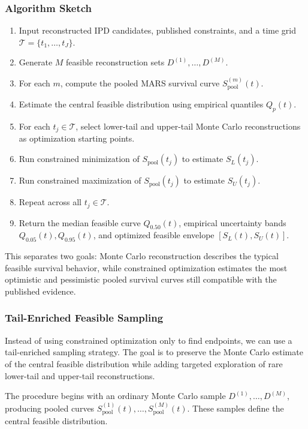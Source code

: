 \documentclass[11pt]{article}
\begin{document}
\subsubsection*{Algorithm Sketch}

\begin{enumerate}
\item Input reconstructed IPD candidates, published constraints, and a time grid \(\mathcal T=\{t_1,\ldots,t_J\}\).
\item Generate \(M\) feasible reconstruction sets \(D^{(1)},\ldots,D^{(M)}\).
\item For each \(m\), compute the pooled MARS survival curve \(S^{(m)}_{\text{pool}}(t)\).
\item Estimate the central feasible distribution using empirical quantiles \(Q_p(t)\).
\item For each \(t_j\in\mathcal T\), select lower-tail and upper-tail Monte Carlo reconstructions as optimization starting points.
\item Run constrained minimization of \(S_{\text{pool}}(t_j)\) to estimate \(S_L(t_j)\).
\item Run constrained maximization of \(S_{\text{pool}}(t_j)\) to estimate \(S_U(t_j)\).
\item Repeat across all \(t_j\in\mathcal T\).
\item Return the median feasible curve \(Q_{0.50}(t)\), empirical uncertainty bands \(Q_{0.05}(t),Q_{0.95}(t)\), and optimized feasible envelope \([S_L(t),S_U(t)]\).
\end{enumerate}

This separates two goals: Monte Carlo reconstruction describes the typical feasible survival behavior, while constrained optimization estimates the most optimistic and pessimistic pooled survival curves still compatible with the published evidence.
\subsubsection*{Tail-Enriched Feasible Sampling}

Instead of using constrained optimization only to find endpoints, we can use a tail-enriched sampling strategy. The goal is to preserve the Monte Carlo estimate of the central feasible distribution while adding targeted exploration of rare lower-tail and upper-tail reconstructions.

The procedure begins with an ordinary Monte Carlo sample \(D^{(1)},\ldots,D^{(M)}\), producing pooled curves \(S^{(1)}_{\text{pool}}(t),\ldots,S^{(M)}_{\text{pool}}(t)\). These samples define the central feasible distribution.
\end{document}
